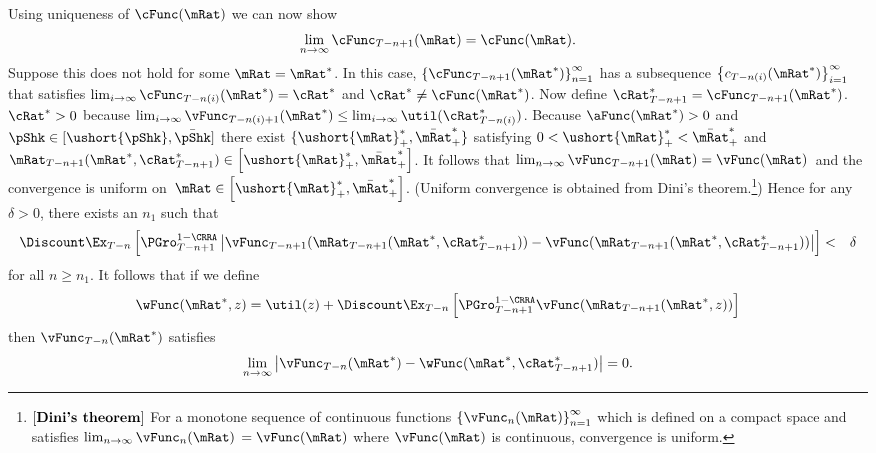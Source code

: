 \documentclass[titlepage]{\econtex}\providecommand{\texname}{BufferStockTheory}%
\begin{document}
Using uniqueness of $\cFunc(\mRat)$ we can now show
\begin{equation}
\lim_{n\rightarrow \infty }\cFunc_{T-n+1}(\mRat) =\cFunc(\mRat).
\end{equation}
Suppose this does not hold for some $\mRat=\mRat^{*}$. In this case, $ \left\{
  \cFunc_{T-n+1}(\mRat^{*})\right\} _{n=1}^{\infty }$ has a subsequence $
\left\{ c_{T-n(i)}(\mRat^{*})\right\} _{i=1}^{\infty }$ that satisfies $
\lim_{i\rightarrow \infty }\cFunc_{T-n(i)}(\mRat^{*})=\cRat^{*}$ and $\cRat^{*}\neq
\cFunc(\mRat^{*})$. Now define $\cRat^{*} _{T-n+1}=\cFunc_{T-n+1}(\mRat^{*})$.  $\cRat^{*}>0$
because $\lim_{ i\rightarrow \infty }\vFunc_{T-n(i)+1}(\mRat^{*})\leq \lim_{
  i\rightarrow \infty }\util(\cRat^{*}_{T-n(i)})$. Because $\aFunc(\mRat^{*})>0$ and
$\pShk \in [\ushort{\pShk},\bar{\pShk}]$ there exist $\{
\ushort{\mRat}_{+}^{*},\bar{\mRat}_{+}^{*}\} $ satisfying $0<
\ushort{\mRat}_{+}^{*}<\bar{\mRat}_{+}^{*}$ and ${\mRat}_{T-n+1}( \mRat^{*},\cRat^{*}
_{T-n+1}) \in \left[ \ushort{\mRat}_{+}^{*},\bar{\mRat}_{+}^{*}\right]$.
It follows that $\lim_{n\rightarrow \infty }\vFunc_{T-n+1}(\mRat)=\vFunc(\mRat)$~and the
convergence is uniform on~$\mRat\in
\left[\ushort{\mRat}_{+}^{*},\bar{\mRat}_{+}^{*}\right]$. (Uniform
convergence is obtained from Dini's theorem.\footnote{$\left[
    \text{\textbf{Dini's theorem}}\right] $ For a monotone sequence of
  continuous functions $\left\{ \vFunc_{n}(\mRat)\right\} _{n=1}^{\infty }$
  which is defined on a compact space and satisfies
  $\lim_{n\rightarrow\infty }\vFunc_{n}(\mRat)$ $=\vFunc(\mRat)$ where $\vFunc(\mRat)$ is
  continuous, convergence is uniform.}) Hence for any $\delta >0$,
there exists an $n_{1}$ such that
\begin{eqnarray*}
\Discount \Ex_{T-n}\left[ {\PGro}_{T-n+1}^{1-\CRRA }\left\vert
\vFunc_{T-n+1}( {\mRat}_{T-n+1}( \mRat^{*},\cRat^{*}
_{T-n+1}) ) -\vFunc( {\mRat}_{T-n+1}( \mRat^{*},
\cRat^{*}_{T-n+1}) ) \right\vert \right]  &<&\delta \notag
\end{eqnarray*}
for all $n\geq n_{1}$. It follows that if we define
\begin{equation}
\wFunc( \mRat^{*},z) =\util(z)+\Discount \Ex_{T-n}\left[ {\PGro}_{T-n+1}^{1-\CRRA }\vFunc( {\mRat}_{T-n+1}( \mRat^{*}
,z) ) \right]
\end{equation}
then $\vFunc_{T-n}(\mRat^{*})$ satisfies
\begin{equation}
\lim_{n\rightarrow \infty }\left\vert \vFunc_{T-n}(\mRat^{*}
)-\wFunc( \mRat^{*},\cRat^{*}_{T-n+1}) \right\vert =0.
\label{Inequality1}
\end{equation}
\end{document}
